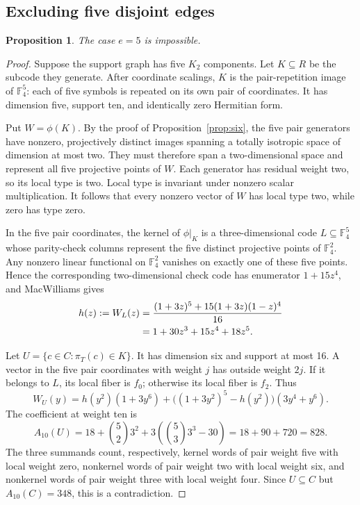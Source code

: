 \documentclass[11pt]{article}
\newtheorem{proposition}[theorem]{Proposition}
\theoremstyle{remark}
\newcommand{\F}{\mathbb F_4}
\begin{document}
\subsection{Excluding five disjoint edges}

\begin{proposition}\label{prop:no-five}
The case $e=5$ is impossible.
\end{proposition}

\begin{proof}
Suppose the support graph has five $K_2$ components.  Let $K\subseteq R$
be the subcode they generate.  After coordinate scalings, $K$ is the
pair-repetition image of $\F^5$: each of five symbols is repeated on
its own pair of coordinates.  It has dimension five, support ten, and
identically zero Hermitian form.

Put $W=\phi(K)$.  By the proof of Proposition~\ref{prop:six}, the five
pair generators have nonzero, projectively distinct images spanning a
totally isotropic space of dimension at most two.  They must therefore
span a two-dimensional space and represent all five projective points
of $W$.  Each generator has residual weight two, so its local type is
two.  Local type is invariant under nonzero scalar multiplication.
It follows that every nonzero vector of $W$ has local type two, while
zero has type zero.

In the five pair coordinates, the kernel of $\phi|_K$ is a
three-dimensional code $L\subseteq\F^5$ whose parity-check columns
represent the five distinct projective points of $\F^2$.  Any nonzero
linear functional on $\F^2$ vanishes on exactly one of these five
points.  Hence the corresponding two-dimensional check code has
enumerator $1+15z^4$, and MacWilliams gives
\begin{align}
 h(z):=W_L(z)
 &=\frac{(1+3z)^5+15(1+3z)(1-z)^4}{16}\notag\\
 &=1+30z^3+15z^4+18z^5.
 \label{eq:hamming}
\end{align}

Let $U=\{c\in C:\pi_T(c)\in K\}$.  It has dimension six and
support at most 16.  A vector in the five pair coordinates with
weight $j$ has outside weight $2j$.  If it belongs to $L$, its local
fiber is $f_0$; otherwise its local fiber is $f_2$.  Thus
\begin{equation}
 W_U(y)=h(y^2)(1+3y^6)
       +\bigl((1+3y^2)^5-h(y^2)\bigr)(3y^4+y^6).
 \label{eq:e5-enumerator}
\end{equation}
The coefficient at weight ten is
\[
 A_{10}(U)=18+\binom52 3^2
                +3\left(\binom53 3^3-30\right)
          =18+90+720=828.
\]
The three summands count, respectively, kernel words of pair weight
five with local weight zero, nonkernel words of pair weight two with
local weight six, and nonkernel words of pair weight three with local
weight four.  Since $U\subseteq C$ but $A_{10}(C)=348$, this is a
contradiction.
\end{proof}
\end{document}
